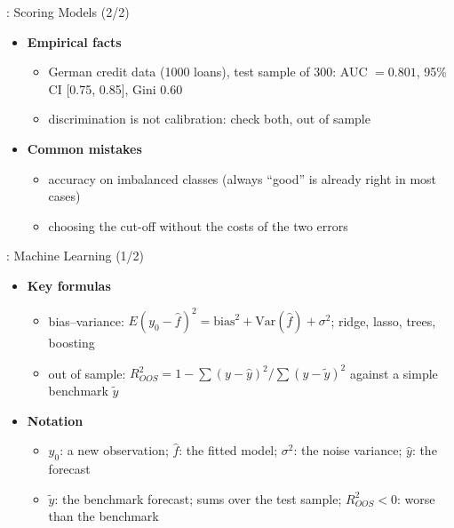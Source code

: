 \begin{frame}{: Scoring Models (2/2)}
\itemsize{\small}
\begin{itemize}
    \item \textbf{Empirical facts}
    \begin{itemize}
        \item German credit data (1000 loans), test sample of 300: AUC $= 0.801$, 95\% CI [0.75, 0.85], Gini 0.60
        \item discrimination is not calibration: check both, out of sample
    \end{itemize}
    \item \textbf{Common mistakes}
    \begin{itemize}
        \item accuracy on imbalanced classes (always ``good'' is already right in most cases)
        \item choosing the cut-off without the costs of the two errors
    \end{itemize}
\end{itemize}
\end{frame}

\begin{frame}{: Machine Learning (1/2)}
\itemsize{\small}
\begin{itemize}
    \item \textbf{Key formulas}
    \begin{itemize}
        \item bias--variance: $E(y_0 - \hat f)^2 = \text{bias}^2 + \mathrm{Var}(\hat f) + \sigma^2$; ridge, lasso, trees, boosting
        \item out of sample: $R^2_{OOS} = 1 - \sum(y - \hat y)^2/\sum(y - \tilde y)^2$ against a simple benchmark $\tilde y$ 
    \end{itemize}
    \item \textbf{Notation}
    \begin{itemize}
        \item $y_0$: a new observation; $\hat f$: the fitted model; $\sigma^2$: the noise variance; $\hat y$: the forecast
        \item $\tilde y$: the benchmark forecast; sums over the test sample; $R^2_{OOS} < 0$: worse than the benchmark
    \end{itemize}
\end{itemize}
\end{frame}


